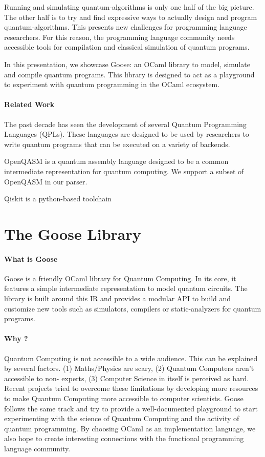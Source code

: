 \documentclass[a4paper]{easychair}
\begin{document}
Running and simulating quantum-algorithms is only one half of the big picture. The other half is to try and find expressive ways to actually design and program quantum-algorithms. This presents new challenges for programming language researchers. For this reason, the programming language community needs accessible tools for compilation and classical simulation of quantum programs.

In this presentation, we showcase Goose: an OCaml library to model, simulate and compile quantum programs. This library is designed to act as a playground to experiment with quantum programming in the OCaml ecosystem.

\paragraph*{Related Work}

The past decade has seen the development of several Quantum Programming Languages (QPLs). These languages are designed to be used by researchers to write quantum programs that can be executed on a variety of backends. 

OpenQASM \cite{Cross2022} is a quantum assembly language designed to be a common intermediate representation for quantum computing. We support a subset of OpenQASM in our parser.

Qiskit is a python-based toolchain

\section{The Goose Library}

\paragraph*{What is Goose} Goose is a friendly OCaml library for Quantum Computing. In its core, it features a simple intermediate representation to model quantum circuits. The library is built around this IR and provides a modular API to build and customize new tools such as simulators, compilers or static-analyzers for quantum programs.

\paragraph*{Why ?} Quantum Computing is not accessible to a wide audience. This can be explained by several factors. (1) Maths/Physics are scary, (2) Quantum Computers aren't accessible to non- experts, (3) Computer Science in itself is perceived as hard.
Recent projects \cite{} tried to overcome these limitations by developing more resources to make Quantum Computing more accessible to computer scientists. Goose follows the same track and try to provide a well-documented playground to start experimenting with the science of Quantum Computing and the activity of quantum programming. By choosing OCaml as an implementation language, we also hope to create interesting connections with the functional programming language community.
\end{document}
